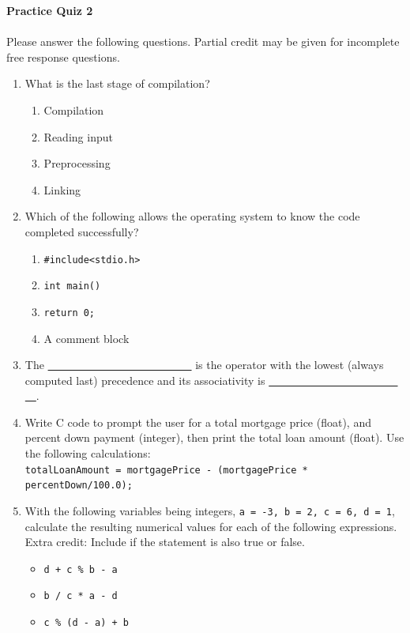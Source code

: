 \documentclass[letter,11pt]{article}
\begin{document}
\huge
\textbf{Practice Quiz 2}
\normalsize

\paragraph{}Please answer the following questions. Partial credit may be given for incomplete free response questions.

\begin{enumerate}
    \item What is the last stage of compilation?
    \begin{enumerate}
        \item Compilation
        \item Reading input
        \item Preprocessing
        \item Linking
    \end{enumerate}
    
    \item Which of the following allows the operating system to know the code completed successfully?
    \begin{enumerate}
        \item \texttt{\#include<stdio.h>}
        \item \texttt{int main()}
        \item \texttt{return 0;}
        \item A comment block
    \end{enumerate}
    
    \item The \underline{~~ ~~ ~~ ~~ ~~ ~~ ~~ ~~ ~~ ~~} is the operator with the lowest (always computed last) precedence and its associativity is \underline{~~ ~~ ~~ ~~ ~~ ~~ ~~ ~~ ~~ ~~}.
    
    \item Write C code to prompt the user for a total mortgage price (float), and percent down payment (integer), then print the total loan amount (float). Use the following calculations: \\
    \texttt{totalLoanAmount = mortgagePrice - (mortgagePrice * percentDown/100.0);}
    
    \item With the following variables being integers, \texttt{a = -3, b = 2, c = 6, d = 1}, calculate the resulting numerical values for each of the following expressions. Extra credit: Include if the statement is also true or false.
    \begin{itemize}
        \item \texttt{d + c \% b - a}
        \item \texttt{b / c * a - d}
        \item \texttt{c \% (d - a) + b}
    \end{itemize}
    

\end{enumerate}
\end{document}
